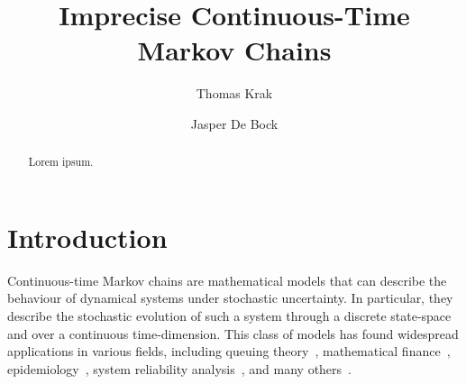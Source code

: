 \documentclass[10pt,a4paper]{paper}
\title{Imprecise Continuous-Time Markov Chains}
\author{Thomas Krak \and Jasper De Bock}
\theoremstyle{definition}
\begin{document}


\date{}
\maketitle

\begin{abstract}
Lorem ipsum.
\end{abstract}

\section{Introduction}\label{sec:introduction}

Continuous-time Markov chains are mathematical models that can describe the behaviour of dynamical systems under stochastic uncertainty. In particular, they describe the stochastic evolution of such a system through a discrete state-space and over a continuous time-dimension. This class of models has found widespread applications in various fields, including queuing theory~\cite{asmussen2008applied,bolch2006queueing}, mathematical finance~\cite{elliott2013default, rolski2009stochastic,sass2004optimizing}, epidemiology~\cite{ duffy1995estimation,jackson2003multistate, lemey2009reconstructing}, system reliability analysis~\cite{besnard2010approach,gokhale2004analysis, wang2007reliability}, and many others~\cite{yin2012continuous}.
\end{document}
